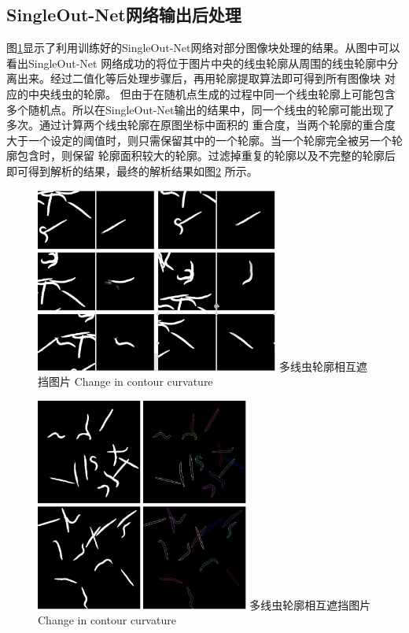 \subsection{SingleOut-Net网络输出后处理}
	图\ref{fig:chap4:singleout}显示了利用训练好的SingleOut-Net网络对部分图像块处理的结果。从图中可以看出SingleOut-Net
	网络成功的将位于图片中央的线虫轮廓从周围的线虫轮廓中分离出来。经过二值化等后处理步骤后，再用轮廓提取算法即可得到所有图像块
	对应的中央线虫的轮廓。
	但由于在随机点生成的过程中同一个线虫轮廓上可能包含
	多个随机点。所以在SingleOut-Net输出的结果中，同一个线虫的轮廓可能出现了多次。通过计算两个线虫轮廓在原图坐标中面积的
	重合度，当两个轮廓的重合度大于一个设定的阈值时，则只需保留其中的一个轮廓。当一个轮廓完全被另一个轮廓包含时，则保留
	轮廓面积较大的轮廓。过滤掉重复的轮廓以及不完整的轮廓后即可得到解析的结果，最终的解析结果如图\ref{fig:chap4:parser}
	所示。
	\begin{figure}[htb]
	  \centering
	  \includegraphics[width=8cm]{figure/chap4/singleout.jpg}
	  \bicaption
		{多线虫轮廓相互遮挡图片}
		{Change in contour curvature}
	  \label{fig:chap4:singleout}
	\end{figure}
	\begin{figure}[htb]
	  \centering
	  \includegraphics[width=7cm]{figure/chap4/Parser_Worms5.jpg}
	  \bicaption
		{多线虫轮廓相互遮挡图片}
		{Change in contour curvature}
	  \label{fig:chap4:parser}
	\end{figure}
